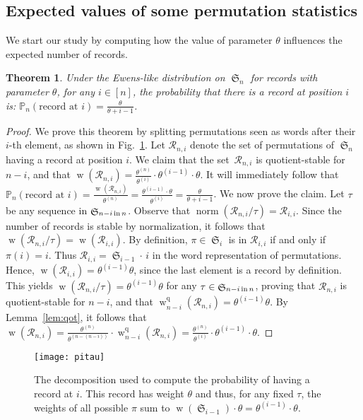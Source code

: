 \documentclass[proceedings]{aofa}
\newcommand{\R}{\mathcal{R}}
\newcommand{\PP}{\mathbb{P}}
\newcommand{\wqotk}[2]{\weight^{\quotient}_{#1}(#2)}
\DeclareMathOperator{\sym}{\mathfrak{S}}
\DeclareMathOperator{\weight}{w}
\DeclareMathOperator{\quotient}{q}
\DeclareMathOperator{\norm}{norm}
\newcommand{\rfact}[2]{#1^{(#2)}}
\newcommand{\symin}[2]{\sym_{#1 \text{\,in\,} #2}}
\newtheorem{theorem}{Theorem}
\begin{document}
\subsection{Expected values of some permutation statistics}

We start our study by computing how the value of parameter $\theta$ influences the expected number of records.

\begin{theorem}\label{lem:records}
Under the Ewens-like distribution on $\sym_n$ for records with parameter $\theta$, 
for any $i \in [n]$, 
the probability that there is a record at position $i$ is: 
$\PP_{n}(\text{record at }i)  = \frac{\theta}{\theta  +  i - 1}$.
\end{theorem}

\begin{proof}
We prove this theorem by splitting permutations seen as words after their $i$-th element, as shown in Fig.~\ref{fig:record}.
Let $\R_{n,i}$ denote the set of permutations of $\sym_{n}$ having a record at position $i$. 
We claim that the set~$\R_{n,i}$ is quotient-stable for $n-i$, and that $\weight(\R_{n,i}) = \frac{\rfact{\theta}{n}}{\rfact{\theta}{i}} \cdot \rfact{\theta}{i-1} \cdot \theta$. 
It will immediately follow that $\PP_{n}(\text{record at }i) = 
\frac{\weight(\R_{n,i})}{\rfact{\theta}{n}} = \frac{\rfact{\theta}{i-1} \cdot \theta}{\rfact{\theta}{i}} = \frac{\theta}{\theta  + i -1}$.
We now prove the claim. 
Let $\tau$ be any sequence in $\symin{n-i}{n}$. 
Observe that $\norm(\R_{n,i}/\tau) = \R_{i,i}$. 
Since the number of records is stable by normalization, it follows that $\weight(\R_{n,i}/\tau)=\weight(\R_{i,i})$. 
By definition, $\pi \in \sym_i$ is in $\R_{i,i}$ if and only if $\pi(i)=i$. Thus $\R_{i,i}=\sym_{i-1}\cdot\, i$ in the word representation of permutations. 
Hence, $\weight(\R_{i,i})={\rfact\theta {i-1}}\theta$, since the last element is a record by definition. 
This yields $\weight(\R_{n,i}/\tau) = {\rfact\theta {i-1}}\theta$ for any $\tau \in \symin{n-i}{n}$, 
proving that $\R_{n,i}$ is quotient-stable for $n-i$, 
and that $\wqotk{n-i}{\R_{n,i}} = {\rfact\theta {i-1}}\theta$. 
 By Lemma~\ref{lem:qot}, it follows that 
$\weight(\R_{n,i}) = \frac{\rfact\theta {n}}{\rfact\theta {n-(n-i)}} \cdot \wqotk{n-i}{\R_{n,i}}= 
\frac{\rfact{\theta}{n}}{\rfact{\theta}{i}} \cdot \rfact{\theta}{i-1} \cdot \theta$.
\end{proof}

\begin{figure}[ht]
\begin{minipage}[]{.45\textwidth}
\texttt{[image: pitau]}
\end{minipage}
\begin{minipage}[]{.54\textwidth}
\caption{The decomposition used to compute the probability of having a record at $i$. 
This record has weight $\theta$ and thus, for any fixed $\tau$, the weights of all possible $\pi$ sum to $\weight(\sym_{i-1})\cdot\theta=\rfact\theta{i-1}\cdot\theta$.\label{fig:record}}
\end{minipage}
\end{figure}
\end{document}

